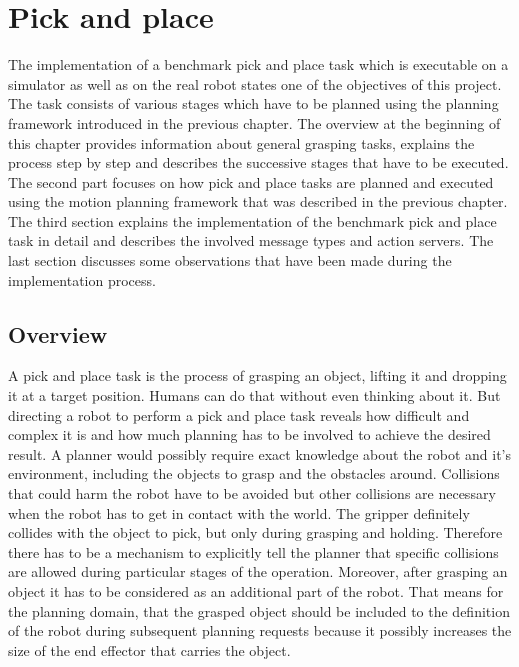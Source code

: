 
\chapter{Pick and place}
\label{chap:pick_place}

The implementation of a benchmark pick and place task which is executable on a simulator as well as on the real robot states one of the objectives of this project. The task consists of various stages which have to be planned using the planning framework introduced in the previous chapter. The overview at the beginning of this chapter provides information about general grasping tasks, explains the process step by step and describes the successive stages that have to be executed. The second part focuses on how pick and place tasks are planned and executed using the motion planning framework that was described in the previous chapter. The third section explains the implementation of the benchmark pick and place task in detail and describes the involved message types and action servers. The last section discusses some observations that have been made during the implementation process.

\section{Overview}

A pick and place task is the process of grasping an object, lifting it and dropping it at a target position. Humans can do that without even thinking about it. But directing a robot to perform a pick and place task reveals how difficult and complex it is and how much planning has to be involved to achieve the desired result. A planner would possibly require exact knowledge about the robot and it's environment, including the objects to grasp and the obstacles around. Collisions that could harm the robot have to be avoided but other collisions are necessary when the robot has to get in contact with the world. The gripper definitely collides with the object to pick, but only during grasping and holding. Therefore there has to be a mechanism to explicitly tell the planner that specific collisions are allowed during particular stages of the operation. Moreover, after grasping an object it has to be considered as an additional part of the robot. That means for the planning domain, that the grasped object should be included to the definition of the robot during subsequent planning requests because it possibly increases the size of the end effector that carries the object. \\

